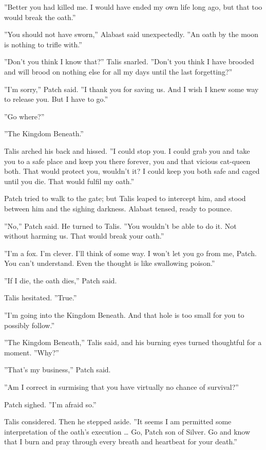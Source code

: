 \documentclass[12pt]{book}
\begin{document}
''Better you had killed me. I would have ended my own life long ago,
but that too would break the oath.''

''You should not have sworn,'' Alabast said unexpectedly. ''An oath by
the moon is nothing to trifle with.''

''Don't you think I know that?'' Talis snarled. ''Don't you think I
have brooded and will brood on nothing else for all my days until the
last forgetting?''

''I'm sorry,'' Patch said. ''I thank you for saving us. And I wish I
knew some way to release you. But I have to go.''

''Go where?''

''The Kingdom Beneath.''

Talis arched his back and hissed. ''I could stop you. I could grab you
and take you to a safe place and keep you there forever, you and that
vicious cat-queen both. That would protect you, wouldn't it? I could
keep you both safe and caged until you die. That would fulfil my
oath.''

Patch tried to walk to the gate; but Talis leaped to intercept him,
and stood between him and the sighing darkness. Alabast tensed, ready
to pounce.

''No,'' Patch said. He turned to Talis. ''You wouldn't be able to do
it. Not without harming us. That would break your oath.''

''I'm a fox. I'm clever. I'll think of some way. I won't let you go
from me, Patch. You can't understand. Even the thought is like
swallowing poison.''

''If I die, the oath dies,'' Patch said.

Talis hesitated. ''True.''

''I'm going into the Kingdom Beneath. And that hole is too small for
you to possibly follow.''

''The Kingdom Beneath,'' Talis said, and his burning eyes turned
thoughtful for a moment. ''Why?''

''That's my business,'' Patch said.

''Am I correct in surmising that you have virtually no chance of
survival?''

Patch sighed. ''I'm afraid so.''

Talis considered. Then he stepped aside. ''It seems I am permitted
some interpretation of the oath's execution \ldots{} Go, Patch son of
Silver. Go and know that I burn and pray through every breath and
heartbeat for your death.''
\end{document}
